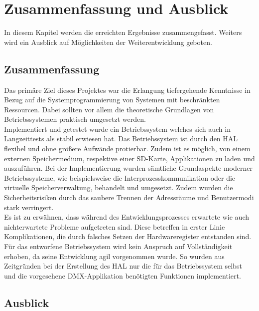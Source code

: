 \section{Zusammenfassung und Ausblick}
\label{summary}

In diesem Kapitel werden die erreichten Ergebnisse zusammengefasst. Weiters wird ein Ausblick auf Möglichkeiten der Weiterentwicklung geboten.

\subsection{Zusammenfassung}

Das primäre Ziel dieses Projektes war die Erlangung tiefergehende Kenntnisse in Bezug auf die Systemprogrammierung von Systemen mit beschränkten Ressourcen. Dabei sollten vor allem die theoretische Grundlagen von Betriebssystemen praktisch umgesetzt werden. \\
 
Implementiert und getestet wurde ein Betriebssystem welches sich auch in Langzeittests als stabil erwiesen hat. Das Betriebssystem ist durch den \ac{HAL} flexibel und ohne größere Aufwände protierbar. Zudem ist es möglich, von einem externen Speichermedium, respektive einer SD-Karte, Applikationen zu laden und auszuführen. 
Bei der Implementierung wurden sämtliche Grundaspekte moderner Betriebssysteme, wie beispielsweise die Interprozesskommunikation oder die virtuelle Speicherverwaltung, behandelt und umgesetzt. Zudem wurden die Sicherheitsrisiken durch das saubere Trennen der Adressräume und Benutzermodi stark verringert. \\
 
Es ist zu erwähnen, dass während des Entwicklungsprozesses erwartete wie auch nichterwartete Probleme aufgetreten sind. Diese betreffen in erster Linie Komplikationen, die durch falsches Setzen der Hardwareregister entstanden sind. \\
 
Für das entworfene Betriebssystem wird kein Anspruch auf Vollständigkeit erhoben, da seine Entwicklung agil vorgenommen wurde. So wurden aus Zeitgründen bei der Erstellung des \ac{HAL} nur die für das Betriebssystem selbst und die vorgesehene \ac{DMX}-Applikation benötigten Funktionen implementiert. \\

\subsection{Ausblick}

